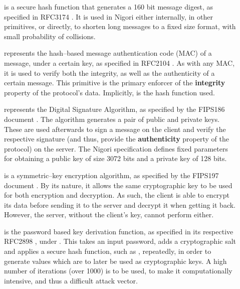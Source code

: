 \begin{description}
  \item[] is a secure hash function that generates a 160 bit message digest, as specified in RFC3174 \cite{RFC3174}.
  It is used in Nigori either internally, in other primitives, or directly, to shorten long messages to a fixed size format, with small probability of collisions.

  \item[] represents the hash--based message authentication code (MAC) of a message, under a certain key, as specified in RFC2104 \cite{RFC2104}.
  As with any MAC, it is used to verify both the integrity, as well as the authenticity of a certain message.
  This primitive is the primary enforcer of the \textbf{integrity} property of the protocol's data.
  Implicitly,  is the hash function used.

  \item[] represents the Digital Signature Algorithm, as specified by the FIPS186 document \cite{DSA}.
  The algorithm generates a pair of public and private keys.
  These are used afterwards to sign a message on the client and verify the respective signature (and thus, provide the \textbf{authenticity} property of the protocol) on the server.
  The Nigori specification defines fixed parameters for obtaining a public key of size 3072 bits and a private key of 128 bits.

  \item[] is a symmetric--key encryption algorithm, as specified by the FIPS197 document \cite{AES}.
  By its nature, it allows the same cryptographic key to be used for both encryption and decryption.
  As such, the client is able to encrypt its data before sending it to the server and decrypt it when getting it back.
  However, the server, without the client's key, cannot perform either.

  \item[] is the password based key derivation function, as specified in its respective RFC2898 \cite{RFC2898}, under .
  This takes an input password, adds a cryptographic salt and applies a secure hash function, such as , repeatedly, in order to generate values which are to later be used as cryptographic keys.
  A high number of iterations (over 1000) is to be used, to make it computationally intensive, and thus a difficult attack vector.
\end{description}


